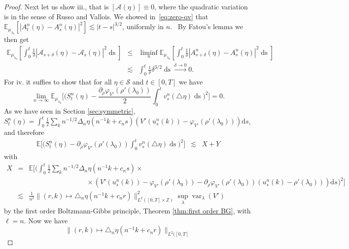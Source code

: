\documentclass[11pt, a4paper]{article}
\newcommand{\mathd}{\mathrm{d}}
\newcommand{\tmop}[1]{\ensuremath{\operatorname{#1}}}
\newcommand{\CS}{\mathscr{S}}
\newcommand{\1}{\mathbf{1}}
\begin{document}
\begin{proof}
  Next let us show iii., that is $[\mathcal{A} (\eta)] \equiv 0$, where the
  quadratic variation is in the sense of Russo and Vallois. We showed in~\eqref{eq:zero-qv} that $\mathbb{E}_{{\mu}_{\lambda_0}} [|
  A^n_t (\eta) - A^n_s (\eta) |^2] \lesssim | t - s |^{3 / 2}$, uniformly in
  $n.$ \ By Fatou's lemma we then get
  \begin{eqnarray*}
    \mathbb{E}_{{\mu}_{\lambda_0}} \left[ \int_0^t \frac{1}{\delta}
    | \mathcal{A}_{s + \delta} (\eta) -\mathcal{A}_s (\eta) |^2 \tmop{ds}
    \right] & \leqslant & \liminf_n \mathbb{E}_{{\mu}_{\lambda_0}} \left[
    \int_0^t \frac{1}{\delta} | A^n_{s + \delta} (\eta) - A^n_s
    (\eta) |^2 \tmop{ds} \right]\\
    & \lesssim & \int_0^t \frac{1}{\delta} \delta^{3 / 2} \tmop{ds}
    \xrightarrow{\delta \rightarrow 0} 0.
  \end{eqnarray*}
  For iv. it suffies to show that for all $\eta \in \CS$ and $t \in
  [0, T]$ we have
  \[ \lim_{n \rightarrow \infty} \mathbb{E}_{{\mu}_{\lambda_0}} \Big[
     \Big( S^n_t (\eta) - \frac{\partial_{\rho} \varphi_{V'} (\rho'
     (\lambda_0))}{2} \int_0^t v^n_s (\triangle \eta) \tmop{ds} \Big)^2
     \Big] = 0. \]
  As we have seen in Section \ref{sec:symmetric}, $S_t^n (\eta) = \int_0^t
  \frac{1}{2} \sum_k n^{- 1 / 2} \Delta_n \eta (n^{- 1} k + c_n s) (V' (u^n_s
  (k)) - \varphi_{V'} (\rho' (\lambda_0))) \mathd s$, and therefore
  \begin{eqnarray*}
    \mathbb{E} \Big[ \Big( S^n_t (\eta) - \partial_{\rho} \varphi_{V'}
    (\rho' (\lambda_0)) \int_0^t v^n_s (\triangle \eta) \tmop{ds} \Big)^2
    \Big] & \lesssim & X + Y
  \end{eqnarray*}
  with
  \begin{eqnarray*}
    X & = & \mathbb{E} \Big[ \Big( \int_0^t \frac{1}{2} \sum_k n^{- 1 / 2}
    \Delta_n \eta (n^{- 1} k + c_n s) \times \\
    && \hspace{100pt} \times ( V' (u^n_s (k)) - \varphi_{V'} ( \rho' (\lambda_0) ) - \partial_{\rho} \varphi_{V'} (\rho' (\lambda_0)) (u_s^n (k) - \rho' (\lambda_0)) ) \mathd s^{} \Big)^2
    \Big]\\
    & \lesssim & \frac{1}{n^2} \| (r, k) \mapsto \triangle_n \eta (n^{- 1} k
    + c_n r) \|_{L^2 ([0, T] \times \mathbb{Z})}^2 \sup_{\lambda}
    \tmop{var}_{\lambda} (V')
  \end{eqnarray*}
  by the first order Boltzmann-Gibbs principle, Theorem \ref{thm:first order
  BG}, with $\ell = n$. Now we have
  \[ \| (r, k) \mapsto \triangle_n \eta (n^{- 1} k + c_n r) \|_{L^2 ([0, T]
}\]
\end{proof}
\end{document}
